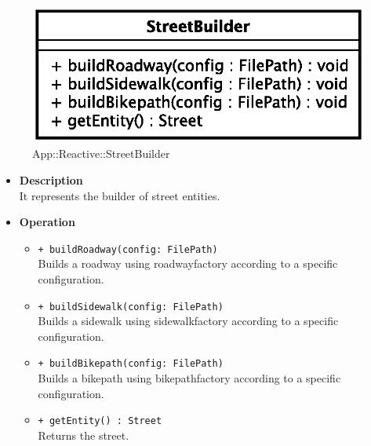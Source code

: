 \begin{figure}[h]
\centering
\includegraphics[scale=0.6,keepaspectratio]{images/solution/street_builder.eps}
\caption{App::Reactive::StreetBuilder}
\label{fig:sd-app-street_builder}
\end{figure}
\FloatBarrier
\begin{itemize}
  \item \textbf{Description} \\
    It represents the builder of street entities. 
  \item \textbf{Operation}
  \begin{itemize} 
    \item \texttt{+ buildRoadway(config: FilePath)} \\
Builds a roadway using roadwayfactory according to a specific configuration.
    \item \texttt{+ buildSidewalk(config: FilePath)} \\
Builds a sidewalk using sidewalkfactory according to a specific configuration.
    \item \texttt{+ buildBikepath(config: FilePath)} \\
Builds a bikepath using bikepathfactory according to a specific configuration.
    \item \texttt{+ getEntity() : Street} \\
Returns the street.
  \end{itemize}
\end{itemize}
